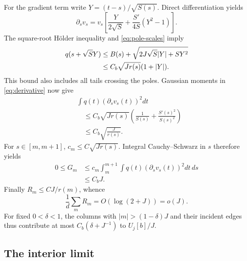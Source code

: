 \documentclass[aps,pra,reprint,superscriptaddress]{revtex4-2}
\theoremstyle{remark}
\begin{document}
For the gradient term write $Y=(t-s)/\sqrt{S(s)}$. Direct
differentiation yields
\begin{equation}
 \partial_sv_s=v_s\left[\frac{Y}{2\sqrt S}
 +\frac{S'}{4S}(Y^2-1)\right].
 \label{eq:derivative}
\end{equation}
The square-root H\"older inequality and \eqref{eq:pole-scales}
imply
\begin{align}
 q(s+\sqrt S Y)
 &\leq B(s)+\sqrt{2J\sqrt S|Y|+SY^2}\notag\\
 &\leq C_b\sqrt{Jr(s)}(1+|Y|).
 \label{eq:q-bound}
\end{align}
This bound also includes all tails crossing the poles. Gaussian
moments in \eqref{eq:derivative} now give
\begin{equation}
\begin{aligned}
&\int q(t)(\partial_sv_s(t))^2dt\\
&\quad\leq C_b\sqrt{Jr(s)}
\left(\frac1{S(s)}+\frac{S'(s)^2}{S(s)^2}\right)\\
&\quad\leq C_b\sqrt{\frac J{r(s)}}.
\end{aligned}
\label{eq:derivative-bound}
\end{equation}
For $s\in[m,m+1]$, $c_m\leq C\sqrt{Jr(s)}$. Integral
Cauchy--Schwarz in $s$ therefore yields
\begin{equation}
\begin{aligned}
0\leq G_m
&\leq c_m\int_m^{m+1}\int q(t)(\partial_sv_s(t))^2dt\,ds\\
&\leq C_bJ.
\end{aligned}
\label{eq:G-bound}
\end{equation}
Finally $R_m\leq CJ/r(m)$, whence
\begin{equation}
 \frac1d\sum_mR_m=O(\log(2+J))=o(J).
 \label{eq:R-bound}
\end{equation}
For fixed $0<\delta<1$, the columns with
$|m|>(1-\delta)J$ and their incident edges thus contribute at most
$C_b(\delta+J^{-1})$ to $U_j[b]/J$.

\subsection{The interior limit}
\end{document}
